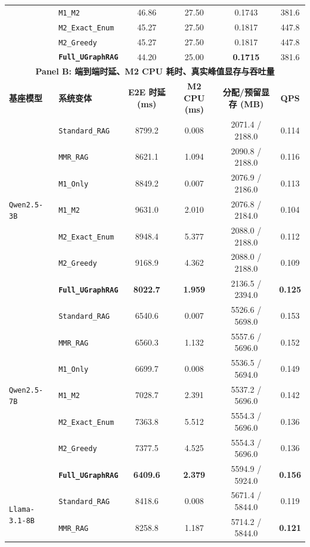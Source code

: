 \documentclass[11pt]{article}
\begin{document}
\begin{table}[t]
{{\begin{tabular}{llcccc}
& \texttt{M1\_M2} & 46.86 & 27.50 & 0.1743 & 381.6 \\
& \texttt{M2\_Exact\_Enum} & 45.27 & 27.50 & 0.1817 & 447.8 \\
& \texttt{M2\_Greedy} & 45.27 & 27.50 & 0.1817 & 447.8 \\
& \textbf{\texttt{Full\_UGraphRAG}} & 44.20 & 25.00 & \textbf{0.1715} & 381.6 \\
\midrule
\midrule
\multicolumn{6}{c}{\textbf{Panel B: 端到端时延、M2 CPU 耗时、真实峰值显存与吞吐量}} \\
\midrule
\textbf{基座模型} & \textbf{系统变体} & \textbf{E2E 时延 (ms)} & \textbf{M2 CPU (ms)} & \textbf{分配/预留显存 (MB)} & \textbf{QPS} \\
\midrule
\multirow{7}{*}{\texttt{Qwen2.5-3B}}
& \texttt{Standard\_RAG} & 8799.2 & 0.008 & 2071.4 / 2188.0 & 0.114 \\
& \texttt{MMR\_RAG} & 8621.1 & 1.094 & 2090.8 / 2188.0 & 0.116 \\
& \texttt{M1\_Only} & 8849.2 & 0.007 & 2076.9 / 2186.0 & 0.113 \\
& \texttt{M1\_M2} & 9631.0 & 2.010 & 2076.8 / 2184.0 & 0.104 \\
& \texttt{M2\_Exact\_Enum} & 8948.4 & 5.377 & 2088.0 / 2188.0 & 0.112 \\
& \texttt{M2\_Greedy} & 9168.9 & 4.362 & 2088.0 / 2188.0 & 0.109 \\
& \textbf{\texttt{Full\_UGraphRAG}} & \textbf{8022.7} & \textbf{1.959} & 2136.5 / 2394.0 & \textbf{0.125} \\
\midrule
\multirow{7}{*}{\texttt{Qwen2.5-7B}}
& \texttt{Standard\_RAG} & 6540.6 & 0.007 & 5526.6 / 5698.0 & 0.153 \\
& \texttt{MMR\_RAG} & 6560.3 & 1.132 & 5557.6 / 5696.0 & 0.152 \\
& \texttt{M1\_Only} & 6699.7 & 0.008 & 5536.5 / 5694.0 & 0.149 \\
& \texttt{M1\_M2} & 7028.7 & 2.391 & 5537.2 / 5696.0 & 0.142 \\
& \texttt{M2\_Exact\_Enum} & 7363.8 & 5.512 & 5554.3 / 5696.0 & 0.136 \\
& \texttt{M2\_Greedy} & 7377.5 & 4.525 & 5554.3 / 5696.0 & 0.136 \\
& \textbf{\texttt{Full\_UGraphRAG}} & \textbf{6409.6} & \textbf{2.379} & 5594.9 / 5924.0 & \textbf{0.156} \\
\midrule
\multirow{7}{*}{\texttt{Llama-3.1-8B}}
& \texttt{Standard\_RAG} & 8418.6 & 0.008 & 5671.4 / 5844.0 & 0.119 \\
& \texttt{MMR\_RAG} & 8258.8 & 1.187 & 5714.2 / 5844.0 & \textbf{0.121} \\

\end{tabular}}}
\end{table}
\end{document}
